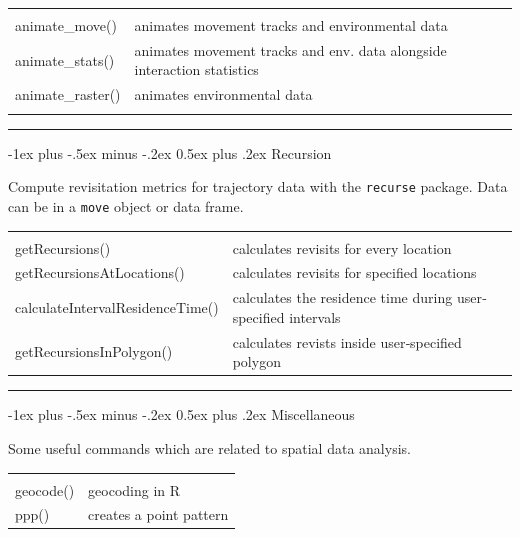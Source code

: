 \documentclass[a4paper,10pt,landscape]{article}
\makeatletter
\renewcommand{\section}{\@startsection{section}{1}{0mm}%
                                {-1ex plus -.5ex minus -.2ex}%
                                {0.5ex plus .2ex}%
                                {\normalfont\large\bfseries}}
\makeatother
\begin{document}
\begin{multicols}{3}
\begin{tabular}{@{}p{\the\MyLen}%
                @{}p{\linewidth-\the\MyLen}@{}}
 & \\
animate\_move() & animates movement tracks and environmental data \\
animate\_stats() & animates movement tracks and env. data alongside interaction statistics \\
animate\_raster() & animates environmental data \\
&

\end{tabular}

\rule{0.32\textwidth}{0.4pt}
\section{Recursion}

Compute revisitation metrics for trajectory data with the \verb!recurse! package.  Data can be in a \verb!move! object or data frame.

\begin{tabular}{@{}p{\the\MyLen + 20pt}%
                @{}p{\linewidth-\the\MyLen - 20pt}@{}}
                & \\
getRecursions() & calculates revisits for every location \\
getRecursionsAtLocations() &  calculates revisits for specified locations \\
calculateIntervalResidenceTime() &  calculates the residence time during user‐specified intervals \\
getRecursionsInPolygon() & calculates revists inside user‐specified polygon \\

\end{tabular}

\rule{0.32\textwidth}{0.4pt}
\section{Miscellaneous}

Some useful commands which are related to spatial data analysis.


\begin{tabular}{@{}p{\the\MyLen}%
                @{}p{\linewidth-\the\MyLen}@{}}
                & \\
geocode() & geocoding in R \\
ppp() & creates a point pattern \\


\end{tabular}
\end{multicols}
\end{document}
